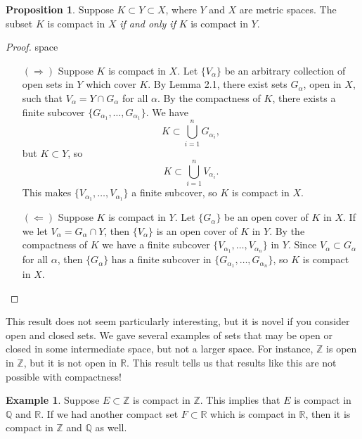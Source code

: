 \documentclass{article}
\newcommand{\R}{\mathbb{R}}
\newcommand{\Q}{\mathbb{Q}}
\newcommand{\Z}{\mathbb{Z}}
\theoremstyle{definition}
\newtheorem{proposition}{Proposition}[section]
\newtheorem{example}{Example}[section]
\begin{document}
\begin{proposition}
	Suppose $ K\subset Y\subset X $, where $ Y $ and $ X $ are metric spaces. The subset $ K $ is compact in $ X $ \textit{if and only if} $ K $ is compact in $ Y $.  
\end{proposition}
\begin{proof}{\color{white}space}
	\begin{enumerate}
		\item[$ (\Longrightarrow) $] Suppose $ K $ is compact in $ X $. Let $ \{V_\alpha\} $ be an arbitrary collection of open sets in $ Y $ which cover $ K $. By Lemma 2.1, there exist sets $ G_\alpha $, open in $ X $, such that $ V_\alpha=Y\cap G_\alpha $ for all $ \alpha $. By the compactness of $ K $, there exists a finite subcover $ \{G_{\alpha_1},\ldots,G_{\alpha_1}\} $. We have $$ K\subset\bigcup_{i=1}^n G_{\alpha_i} ,$$ but $ K\subset Y $, so $$ K\subset\bigcup_{i=1}^n V_{\alpha_i} . $$ This makes $ \{V_{\alpha_1},\ldots,V_{\alpha_1}\} $ a finite subcover, so $ K $ is compact in $ X $. 
		\item[$ (\Longleftarrow) $] Suppose $ K $ is compact in $ Y $. Let $ \{G_\alpha\} $ be an open cover of $ K $ in $ X $. If we let $ V_\alpha=G_\alpha\cap Y $, then $ \{V_\alpha\} $ is an open cover of $ K $ in $ Y $. By the compactness of $ K $ we have a finite subcover $ \{V_{\alpha_1},\ldots,V_{\alpha_n}\} $ in $ Y $. Since $ V_\alpha\subset G_\alpha $ for all $ \alpha $, then $ \{G_\alpha\} $ has a finite subcover in $ \{G_{\alpha_1},\ldots,G_{\alpha_n}\} $, so $ K $ is compact in $ X $. 
	\end{enumerate}
	
\end{proof}
This result does not seem particularly interesting, but it is novel if you consider open and closed sets. We gave several examples of sets that may be open or closed in some intermediate space, but not a larger space. For instance, $ \Z $ is open in $ \Z $, but it is not open in $ \R $. This result tells us that results like this are not possible with compactness!
\begin{example}
	Suppose $ E\subset \Z $ is compact in $ \Z $. This implies that $ E $ is compact in $ \Q $ and $ \R $. If we had another compact set $ F\subset\R $ which is compact in $ \R $, then it is compact in $ \Z $ and $ \Q $ as well. 
\end{example}
\end{document}

